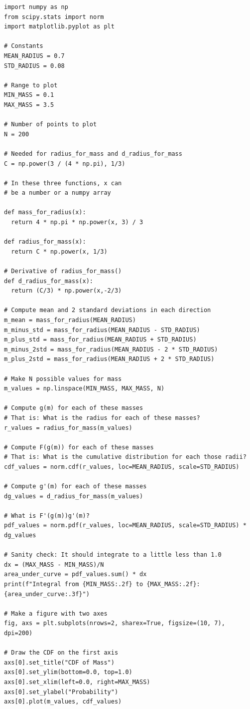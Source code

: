 \begin{verbatim}
import numpy as np
from scipy.stats import norm
import matplotlib.pyplot as plt

# Constants
MEAN_RADIUS = 0.7
STD_RADIUS = 0.08

# Range to plot
MIN_MASS = 0.1
MAX_MASS = 3.5

# Number of points to plot
N = 200

# Needed for radius_for_mass and d_radius_for_mass
C = np.power(3 / (4 * np.pi), 1/3)

# In these three functions, x can
# be a number or a numpy array

def mass_for_radius(x):
  return 4 * np.pi * np.power(x, 3) / 3

def radius_for_mass(x):
  return C * np.power(x, 1/3)

# Derivative of radius_for_mass()
def d_radius_for_mass(x):
  return (C/3) * np.power(x,-2/3)

# Compute mean and 2 standard deviations in each direction
m_mean = mass_for_radius(MEAN_RADIUS)
m_minus_std = mass_for_radius(MEAN_RADIUS - STD_RADIUS)
m_plus_std = mass_for_radius(MEAN_RADIUS + STD_RADIUS)
m_minus_2std = mass_for_radius(MEAN_RADIUS - 2 * STD_RADIUS)
m_plus_2std = mass_for_radius(MEAN_RADIUS + 2 * STD_RADIUS)

# Make N possible values for mass
m_values = np.linspace(MIN_MASS, MAX_MASS, N)

# Compute g(m) for each of these masses
# That is: What is the radius for each of these masses?
r_values = radius_for_mass(m_values)

# Compute F(g(m)) for each of these masses
# That is: What is the cumulative distribution for each those radii?
cdf_values = norm.cdf(r_values, loc=MEAN_RADIUS, scale=STD_RADIUS)

# Compute g'(m) for each of these masses
dg_values = d_radius_for_mass(m_values)

# What is F'(g(m))g'(m)?
pdf_values = norm.pdf(r_values, loc=MEAN_RADIUS, scale=STD_RADIUS) * dg_values

# Sanity check: It should integrate to a little less than 1.0
dx = (MAX_MASS - MIN_MASS)/N
area_under_curve = pdf_values.sum() * dx
print(f"Integral from {MIN_MASS:.2f} to {MAX_MASS:.2f}: {area_under_curve:.3f}")

# Make a figure with two axes
fig, axs = plt.subplots(nrows=2, sharex=True, figsize=(10, 7), dpi=200)

# Draw the CDF on the first axis
axs[0].set_title("CDF of Mass")
axs[0].set_ylim(bottom=0.0, top=1.0)
axs[0].set_xlim(left=0.0, right=MAX_MASS)
axs[0].set_ylabel("Probability")
axs[0].plot(m_values, cdf_values)


\end{verbatim}
